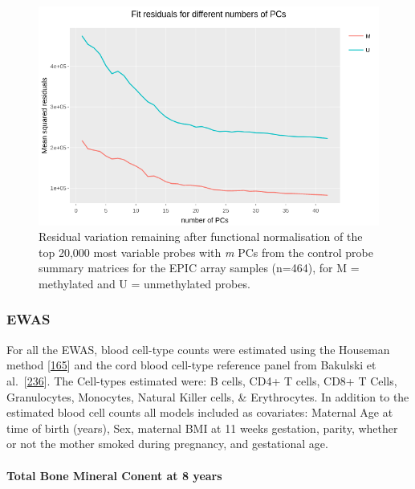 \documentclass[
]{book}
\begin{document}
\begin{figure}

{\centering \includegraphics[width=0.8\linewidth]{figs/SWSfunnormPCsEPIC} 

}

\caption{Residual variation remaining after functional normalisation of the top 20,000 most variable probes with \emph{m} PCs from the control probe summary matrices for the EPIC array samples (n=464), for M = methylated and U = unmethylated probes.}\label{fig:SWSfunnormPCsEPIC}
\end{figure}



\hypertarget{ewas-1}{%
\subsubsection{EWAS}\label{ewas-1}}

For all the EWAS, blood cell-type counts were estimated using the Houseman method {[}\protect\hyperlink{ref-Houseman2012}{165}{]} and the cord blood cell-type reference panel from Bakulski et al.~{[}\protect\hyperlink{ref-Bakulski2016}{236}{]}.
The Cell-types estimated were: B cells, CD4+ T cells, CD8+ T Cells, Granulocytes, Monocytes, Natural Killer cells, \& Erythrocytes.
In addition to the estimated blood cell counts all models included as covariates: Maternal Age at time of birth (years), Sex, maternal BMI at 11 weeks gestation, parity, whether or not the mother smoked during pregnancy, and gestational age.

\hypertarget{total-bone-mineral-conent-at-8-years}{%
\paragraph{Total Bone Mineral Conent at 8 years}\label{total-bone-mineral-conent-at-8-years}}
\end{document}
